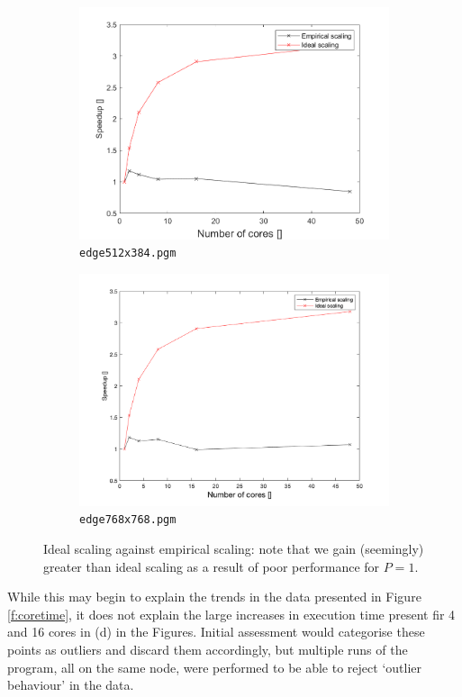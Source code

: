 \documentclass{article} %
\begin{document}
\begin{figure}
\begin{subfigure}[b]{.4\textwidth}
    \includegraphics[width=\textwidth]{figures/speedup_384.png}
    \caption{\texttt{edge512x384.pgm}}
    \label{fig:speedup512}
\end{subfigure}
\hfill
\begin{subfigure}[b]{.4\textwidth}
    \centering
    \includegraphics[width=\textwidth]{figures/speedup_768.png}
    \caption{\texttt{edge768x768.pgm}}
    \label{fig:speedup768}
\end{subfigure}
\caption{Ideal scaling against empirical scaling: note that we gain (seemingly) greater than ideal scaling as a result of poor performance for $P=1$.}
\label{f:speedup}
\end{figure}

While this may begin to explain the trends in the data presented in Figure \ref{f:coretime}, it does not explain the large increases in execution time present fir 4 and 16 cores in (d) in the Figures.
Initial assessment would categorise these points as outliers and discard them accordingly, but multiple runs of the program, all on the same node, were performed to be able to reject `outlier behaviour' in the data.
\end{document}
